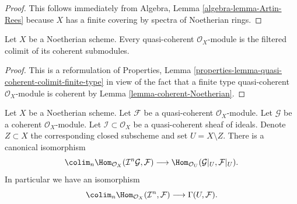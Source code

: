 \begin{proof}
This follows immediately from
Algebra, Lemma \ref{algebra-lemma-Artin-Rees}
because $X$ has a finite covering by spectra of Noetherian rings.
\end{proof}

\begin{lemma}
\label{lemma-directed-colimit-coherent}
Let $X$ be a Noetherian scheme. Every quasi-coherent $\mathcal{O}_X$-module
is the filtered colimit of its coherent submodules.
\end{lemma}

\begin{proof}
This is a reformulation of Properties, Lemma
\ref{properties-lemma-quasi-coherent-colimit-finite-type}
in view of the fact that a finite type quasi-coherent
$\mathcal{O}_X$-module is coherent by
Lemma \ref{lemma-coherent-Noetherian}.
\end{proof}

\begin{lemma}
\label{lemma-homs-over-open}
Let $X$ be a Noetherian scheme.
Let $\mathcal{F}$ be a quasi-coherent $\mathcal{O}_X$-module.
Let $\mathcal{G}$ be a coherent $\mathcal{O}_X$-module.
Let $\mathcal{I} \subset \mathcal{O}_X$ be a quasi-coherent sheaf of
ideals. Denote $Z \subset X$ the corresponding closed subscheme and
set $U = X \setminus Z$.
There is a canonical isomorphism
$$
\colim_n \Hom_{\mathcal{O}_X}(\mathcal{I}^n\mathcal{G}, \mathcal{F})
\longrightarrow
\Hom_{\mathcal{O}_U}(\mathcal{G}|_U, \mathcal{F}|_U).
$$
In particular we have an isomorphism
$$
\colim_n \Hom_{\mathcal{O}_X}(
\mathcal{I}^n, \mathcal{F})
\longrightarrow
\Gamma(U, \mathcal{F}).
$$
\end{lemma}

